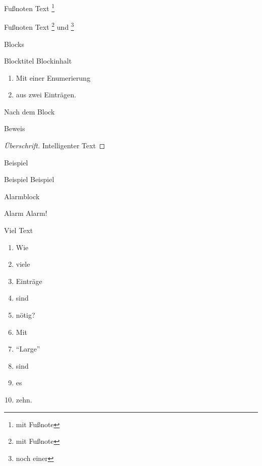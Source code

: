 \documentclass[aspectratio=169]{beamer}
\begin{document}
\begin{frame}{Fußnoten}
Text \footnote{mit Fußnote}
\end{frame}

\begin{frame}{Fußnoten}
Text \footnote{mit Fußnote} und \footnote{noch einer}

\end{frame}

\begin{frame}{Blocks}
\begin{block}{Blocktitel}
Blockinhalt
\begin{enumerate}
\item Mit einer Enumerierung
\item aus zwei Einträgen.
\end{enumerate}
\end{block}
Nach dem Block
\end{frame}

\begin{frame}{Beweis}
\begin{proof}[Überschrift]
Intelligenter Text
\end{proof}
\end{frame}

\begin{frame}{Beispiel}
\begin{exampleblock}{Beispiel}
Beispiel
\end{exampleblock}
\end{frame}

\begin{frame}{Alarmblock}
\begin{alertblock}{Alarm}
Alarm!
\end{alertblock}
\end{frame}

\begin{frame}[allowframebreaks]{Viel Text}
\Large
\begin{enumerate}
\item Wie
\item viele
\item Einträge
\item sind
\item nötig?
\item Mit
\item "`Large"'
\item sind
\item es
\item zehn.
\end{enumerate}
\end{frame}
\end{document}
